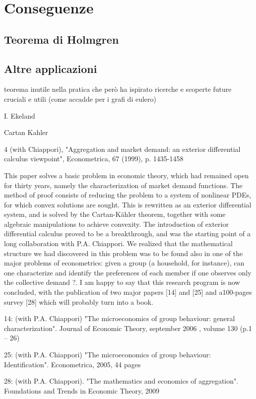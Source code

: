 \chapter{Conseguenze}
\section{Teorema di Holmgren}

\section{Altre applicazioni}
teorema inutile nella pratica che però ha ispirato ricerche e scoperte future cruciali e utili (come accadde per i grafi di eulero)

I. Ekeland

Cartan Kahler

4 (with Chiappori), "Aggregation and market demand: an exterior differential calculus viewpoint", Econometrica, 67 (1999), p. 1435-1458

This paper solves a basic problem in economic theory, which had remained open for thirty years, namely the characterization of market demand functions. The method of proof consists of reducing the problem to a system of nonlinear PDEs, for which convex solutions are sought. This is rewritten as an exterior differential system, and is solved by the Cartan-Kähler theorem, together with some algebraic manipulations to achieve convexity. The introduction of exterior differential calculus proved to be a breakthrough, and was the starting point of a long collaboration with P.A. Chiappori. We realized that the mathematical structure we had discovered in this problem was to be found also in one of the major problems of econometrics: given a group (a household, for instance), can one characterize and identify the preferences of each member if one observes only the collective demand ?. I am happy to say that this research program is now concluded, with the publication of two major papers [14] and [25] and a100-pages survey [28] which will probably turn into a book.

14: (with P.A. Chiappori) "The microeconomics of group behaviour: general characterization". Journal of Economic Theory, september 2006 , volume 130 (p.1 – 26)

25: (with P.A. Chiappori) "The microeconomics of group behaviour: Identification". Econometrica, 2005, 44 pages

28: (with P.A. Chiappori). "The mathematics and economics of aggregation". Foundations and Trends in Economic Theory, 2009